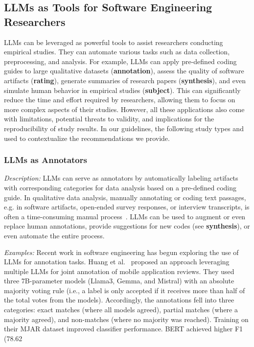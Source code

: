 \documentclass[11pt]{article}
\begin{document}
\subsection{LLMs as Tools for Software Engineering Researchers}

LLMs can be leveraged as powerful tools to assist researchers conducting empirical studies.
They can automate various tasks such as data collection, preprocessing, and analysis.
For example, LLMs can apply pre-defined coding guides to large qualitative datasets (\textbf{annotation}), assess the quality of software artifacts (\textbf{rating}), generate summaries of research papers (\textbf{synthesis}), and even simulate human behavior in empirical studies (\textbf{subject}).
This can significantly reduce the time and effort required by researchers, allowing them to focus on more complex aspects of their studies.
However, all these applications also come with limitations, potential threats to validity, and implications for the reproducibility of study results.
In our guidelines, the following study types and used to contextualize the recommendations we provide.


\subsubsection{LLMs as Annotators}

\emph{Description:} LLMs can serve as annotators by automatically labeling artifacts with corresponding categories for data analysis based on a pre-defined coding guide.
In qualitative data analysis, manually annotating or coding text passages, e.g. in software artifacts, open-ended survey responses, or interview transcripts, is often a time-consuming manual process~\cite{DBLP:journals/ase/BanoHZT24}.
LLMs can be used to augment or even replace human annotations, provide suggestions for new codes (see \textbf{synthesis}), or even automate the entire process.

\emph{Examples:} Recent work in software engineering has begun exploring the use of LLMs for annotation tasks.
Huang et al.~\cite{Huang2023Enhancing} proposed an approach leveraging multiple LLMs for joint annotation of mobile application reviews. 
They used three 7B-parameter models (Llama3, Gemma, and Mistral) with an absolute majority voting rule (i.e., a label is only accepted if it receives more than half of the total votes from the models). 
Accordingly, the annotations fell into three categories: exact matches (where all models agreed), partial matches (where a majority agreed), and non-matches (where no majority was reached).
Training on their MJAR dataset improved classifier performance. BERT achieved higher F1 (78.62%
\end{document}
